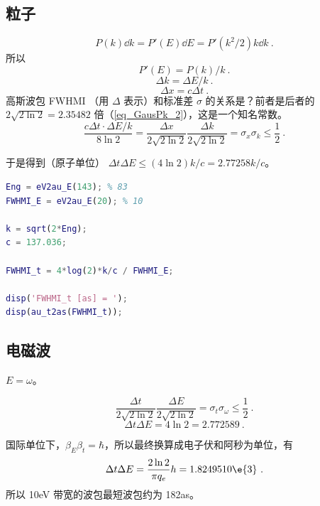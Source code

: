 
\subsection{粒子}
\begin{equation}
P(k)\dd{k} = P'(E)\dd{E} = P'(k^2/2)k\dd{k}~.
\end{equation}
所以
\begin{equation}
P'(E) = P(k)/k~.
\end{equation}
\begin{equation}
\Delta k = \Delta E/k~.
\end{equation}
\begin{equation}
\Delta x = c\Delta t~.
\end{equation}
高斯波包 FWHMI （用 $\Delta$ 表示）和标准差 $\sigma$ 的关系是？前者是后者的 $2\sqrt{2\ln 2} = 2.35482$ 倍（\autoref{eq_GausPk_2}），这是一个知名常数。
\begin{equation}
\frac{c\Delta t \cdot \Delta E/k}{8\ln 2} = \frac{\Delta x}{2\sqrt{2\ln 2}}\frac{\Delta k}{2\sqrt{2\ln 2}} = \sigma_x \sigma_k \leq \frac{1}{2}~.
\end{equation}

于是得到（原子单位） $\Delta t\Delta E \leq (4\ln 2)k/c = 2.77258 k/c$。

\begin{lstlisting}[language=matlab]
% 以上计算的 Matlab 代码
Eng = eV2au_E(143); % 83
FWHMI_E = eV2au_E(20); % 10

k = sqrt(2*Eng);
c = 137.036;

FWHMI_t = 4*log(2)*k/c / FWHMI_E;

disp('FWHMI_t [as] = ');
disp(au_t2as(FWHMI_t));
\end{lstlisting}

\subsection{电磁波}
$E = \omega$。

\begin{equation}
\frac{\Delta t}{2\sqrt{2\ln 2}}\frac{\Delta E}{2\sqrt{2\ln 2}} = \sigma_t \sigma_\omega \leq \frac{1}{2}~.
\end{equation}
\begin{equation}
\Delta t\Delta E = 4\ln 2 = 2.772589~.
\end{equation}

国际单位下，$\beta_E\beta_t = \hbar$，所以最终换算成电子伏和阿秒为单位，有
\begin{equation}
\Delta t \Delta E  = \frac{2\ln 2}{\pi q_e}h = 1.8249510\e{3}~.
\end{equation}
所以 10eV 带宽的波包最短波包约为 182as。
